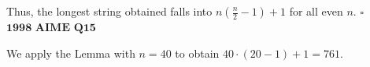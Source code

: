 \begin{enumerate}
 Thus, the longest string obtained falls into $n(\frac{n}{2} -1) + 1$ for all even $n$. $\square$
$\textbf{1998 AIME Q15}$

 We apply the Lemma with $n = 40$ to obtain $40 \cdot(20-1) + 1 = \boxed{761}$.

 


\end{enumerate}